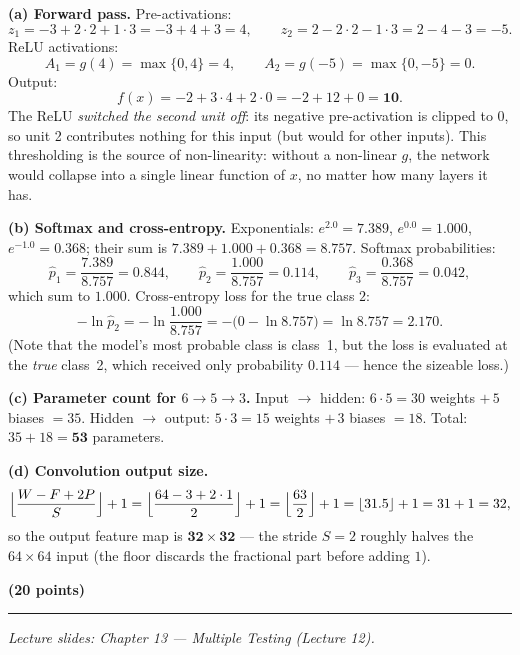 \documentclass[11pt,a4paper]{article}
\newcommand{\problem}[2]{\par\vspace{7mm}\noindent{\large\textbf{Problem #1}}%
  \hfill{\large\textbf{(#2 points)}}\par\nopagebreak\vspace{0.6mm}%
  \noindent\rule{\textwidth}{0.6pt}\par\nopagebreak\vspace{2.5mm}}
\begin{document}
\ifdefined\withsolutions
\begin{solutionbox}
\textbf{(a) Forward pass.}
Pre-activations:
\[
  z_1=-3+2\cdot 2+1\cdot 3=-3+4+3=4,\qquad
  z_2=2-2\cdot 2-1\cdot 3=2-4-3=-5 .
\]
ReLU activations:
\[
  A_1=g(4)=\max\{0,4\}=4,\qquad A_2=g(-5)=\max\{0,-5\}=0 .
\]
Output:
\[
  f(x)=-2+3\cdot 4+2\cdot 0=-2+12+0=\mathbf{10}.
\]
The ReLU \emph{switched the second unit off}: its negative pre-activation is clipped to $0$,
so unit 2 contributes nothing for this input (but would for other inputs). This thresholding
is the source of non-linearity: without a non-linear $g$, the network would collapse into a
single linear function of $x$, no matter how many layers it has.

\medskip
\textbf{(b) Softmax and cross-entropy.}
Exponentials: $e^{2.0}=7.389$, $e^{0.0}=1.000$, $e^{-1.0}=0.368$; their sum is
$7.389+1.000+0.368=8.757$. Softmax probabilities:
\[
  \hat{p}_1=\frac{7.389}{8.757}=0.844,\qquad
  \hat{p}_2=\frac{1.000}{8.757}=0.114,\qquad
  \hat{p}_3=\frac{0.368}{8.757}=0.042,
\]
which sum to $1.000$. Cross-entropy loss for the true class $2$:
\[
  -\ln\hat{p}_2=-\ln\frac{1.000}{8.757}=-\bigl(0-\ln 8.757\bigr)=\ln 8.757=\mathbf{2.170}.
\]
(Note that the model's most probable class is class~1, but the loss is evaluated at the
\emph{true} class~2, which received only probability $0.114$ --- hence the sizeable loss.)

\medskip
\textbf{(c) Parameter count for $6\to 5\to 3$.}
Input $\to$ hidden: $6\cdot 5=30$ weights $+\,5$ biases $=35$.
Hidden $\to$ output: $5\cdot 3=15$ weights $+\,3$ biases $=18$.
Total: $35+18=\mathbf{53}$ parameters.

\medskip
\textbf{(d) Convolution output size.}
\[
  \Bigl\lfloor\frac{W-F+2P}{S}\Bigr\rfloor+1
  =\Bigl\lfloor\frac{64-3+2\cdot 1}{2}\Bigr\rfloor+1
  =\Bigl\lfloor\frac{63}{2}\Bigr\rfloor+1=\lfloor 31.5\rfloor+1=31+1=32,
\]
so the output feature map is $\mathbf{32\times 32}$ --- the stride $S=2$ roughly halves the
$64\times 64$ input (the floor discards the fractional part before adding $1$).
\end{solutionbox}
\fi

\problem{6: Multiple testing}{20}
{\small\itshape Lecture slides: Chapter 13 --- Multiple Testing (Lecture 12).}\par\vspace{1mm}
\end{document}

